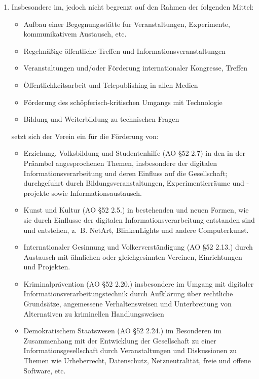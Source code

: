 \documentclass[10pt,a4paper]{scrartcl}
\begin{document}
\begin{enumerate}
\item Insbesondere im, jedoch nicht begrenzt auf den Rahmen der folgenden Mittel:
	\begin{itemize}
		\item Aufbau einer Begegnungsstätte fur Veranstaltungen, Experimente, kommunikativem Austausch, etc.
		\item Regelmäßige öffentliche Treffen und Informationsveranstaltungen
		\item Veranstaltungen und/oder Förderung internationaler Kongresse, Treffen
		\item Öffentlichkeitsarbeit und Telepublishing in allen Medien
		\item Förderung des schöpferisch-kritischen Umgangs mit Technologie
		\item Bildung und Weiterbildung zu technischen Fragen
	\end{itemize}
	setzt sich der Verein ein für die Förderung von:
	\begin{itemize}
		\item Erziehung, Volksbildung und Studentenhilfe (AO §52 2.7) in den in der Präambel angesprochenen Themen,
			insbesondere der digitalen Informationsverarbeitung und deren Einfluss auf die Gesellschaft;
			durchgefuhrt durch Bildungsveranstaltungen, Experimentierräume und -projekte sowie Informationsaustausch.
		\item Kunst und Kultur (AO §52 2.5.) in bestehenden und neuen Formen, wie sie durch Einflusse der digitalen
			Informationsverarbeitung entstanden sind und entstehen, z.\, B. NetArt, BlinkenLights und andere Computerkunst.
		\item Internationaler Gesinnung und Volkerverständigung (AO §52 2.13.) durch Austausch mit ähnlichen oder gleichgesinnten
			Vereinen, Einrichtungen und Projekten.
		\item Kriminalprävention (AO §52 2.20.) insbesondere im Umgang mit digitaler Informationsverarbeitungstechnik durch
			Aufklärung über rechtliche Grundsätze, angemessene Verhaltensweisen und Unterbreitung von Alternativen zu 
			kriminellen Handlungsweisen
		\item Demokratischem Staatswesen (AO §52 2.24.) im Besonderen im Zusammenhang mit der Entwicklung der Gesellschaft 
			zu einer Informationsgesellschaft durch Veranstaltungen und Diskussionen zu Themen wie Urheberrecht, Datenschutz, 
			Netzneutralität, freie und offene Software, etc.
	\end{itemize}
\end{enumerate}
\end{document}
